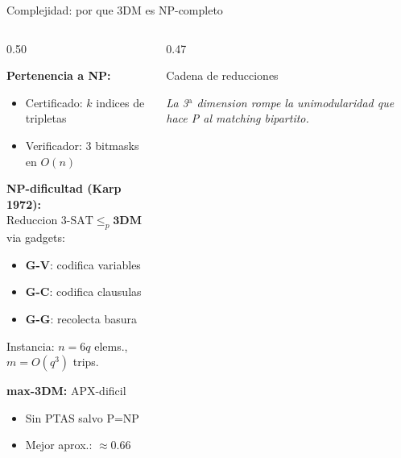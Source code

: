 \begin{frame}{Complejidad: por que 3DM es NP-completo}

\begin{columns}[T]
\begin{column}{0.50\textwidth}
{\small
\textbf{Pertenencia a NP:}
\begin{itemize}
  \item Certificado: $k$ indices de tripletas
  \item Verificador: 3 bitmasks en $O(n)$
\end{itemize}

\smallskip
\textbf{NP-dificultad (Karp 1972):}\\
Reduccion $\text{3-SAT} \le_p \mathbf{3DM}$ via gadgets:
\begin{itemize}
  \item \textbf{G-V}: codifica variables
  \item \textbf{G-C}: codifica clausulas
  \item \textbf{G-G}: recolecta basura
\end{itemize}
Instancia: $n{=}6q$ elems., $m{=}O(q^3)$ trips.

\smallskip
\textbf{max-3DM:} APX-dificil
\begin{itemize}
  \item Sin PTAS salvo P=NP
  \item Mejor aprox.: $\approx 0.66$
\end{itemize}
}
\end{column}

\begin{column}{0.47\textwidth}

\begin{block}{Cadena de reducciones}
\centering
\smallskip
{}

\smallskip
{\small\textit{La 3$^{\mathrm{a}}$ dimension rompe la unimodularidad que hace P al matching bipartito.}}
\end{block}

\end{column}
\end{columns}

\end{frame}
